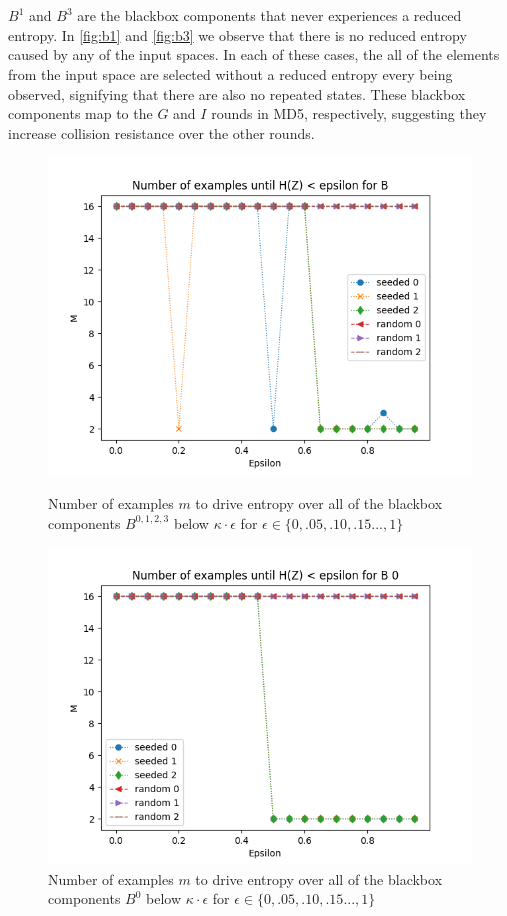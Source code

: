 \documentclass[letterpaper,twocolumn,10pt]{article}
\begin{document}
\\
\\
$B^1$ and $B^3$ are the blackbox components that never experiences a reduced entropy. In \ref{fig:b1} and \ref{fig:b3} we observe that there is no reduced entropy caused by any of the input spaces. In each of these cases, the all of the elements from the input space are selected without a reduced entropy every being observed, signifying that there are also no repeated states. These blackbox components map to the $G$ and $I$ rounds in MD5, respectively, suggesting they increase collision resistance over the other rounds. 

\begin{figure}
\includegraphics[width=\linewidth]{figs/thm1_allbs.png}
\caption{\label{fig:thm1} Number of examples $m$ to drive entropy over all of the blackbox components $B^{0,1,2,3}$ below $\kappa \cdot \epsilon$ for $\epsilon \in \{0, .05, .10, .15...,1\}$}

\includegraphics[width=\linewidth]{figs/seeded_0.png}
\caption{\label{fig:b0} Number of examples $m$ to drive entropy over all of the blackbox components $B^{0}$ below $\kappa \cdot \epsilon$ for $\epsilon \in \{0, .05, .10, .15...,1\}$ }
\end{figure} 
\end{document}
